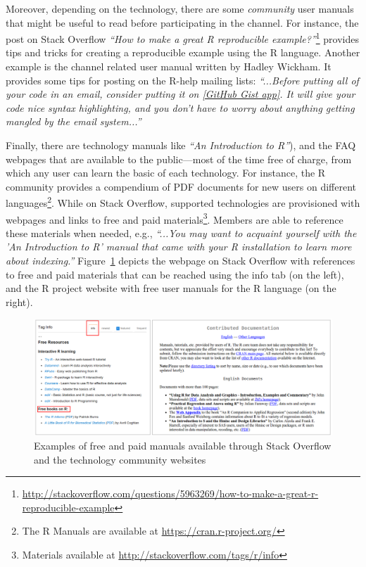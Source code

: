 \documentclass{sig-alternate-05-2015}
\begin{document}
		Moreover, depending on the technology, there are some \textit{community} user manuals that might be useful to read before participating in the channel.
		For instance, the post on Stack Overflow \textit{``How to make a great R reproducible example?''}\footnote{\url{http://stackoverflow.com/questions/5963269/how-to-make-a-great-r-reproducible-example}} provides tips and tricks for creating a reproducible example using the R language.
	 	Another example is the channel related user manual written by Hadley Wickham.
	 	It provides some tips for posting on the R-help mailing lists: \textit{``...Before putting all of your code in an email, consider putting it on \href{http://gist.github.com/}{[GitHub Gist app]}. It will give your code nice syntax highlighting, and you don't have to worry about anything getting mangled by the email system...''}

		Finally, there are technology manuals like \textit{``An Introduction to R''}), and the FAQ webpages that are available to the public---most of the time free of charge, from which any user can learn the basic of each technology.
		For instance, the R community provides a compendium of PDF documents for new users on different languages\footnote{The R Manuals are available at \url{https://cran.r-project.org/}}.
		While on Stack Overflow, supported technologies are provisioned with webpages and links to free and paid materials\footnote{Materials available at \url{http://stackoverflow.com/tags/r/info}}.
		Members are able to reference these materials when needed, e.g., \textit{``...You may want to acquaint yourself with the 'An Introduction to R' manual that came with your R installation to learn more about indexing.''}
		Figure~\ref{fig:RManuals} depicts the webpage on Stack Overflow with references to free and paid materials that can be reached using the info tab (on the left), and the R project website with free user manuals for the R language (on the right).

		\begin{figure} [!htb]
			\centering
			\includegraphics[width=1\columnwidth]{Figures/RManuals}
			\caption{Examples of free and paid manuals available through Stack Overflow and the technology community websites}
			\label{fig:RManuals}
		\end{figure}
\end{document}
